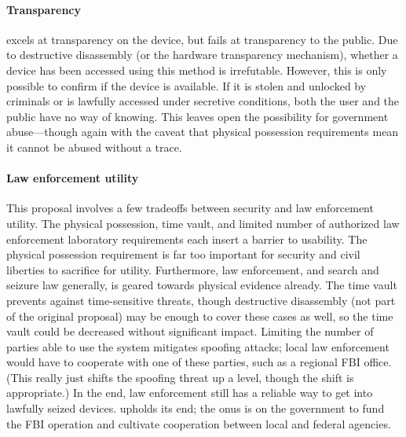 \paragraph*{Transparency} \ldawmsr excels at transparency on the device, but fails at transparency to the public. Due to
destructive disassembly (or the hardware transparency mechanism), whether a device has been accessed using this method
is irrefutable. However, this is only possible to confirm if the device is available. If it is stolen and unlocked by
criminals or is lawfully accessed under secretive conditions, both the user and the public have no way of knowing. This
leaves open the possibility for government abuse---though again with the caveat that physical possession requirements
mean it cannot be abused without a trace.

\paragraph*{Law enforcement utility} This proposal involves a few tradeoffs between security and law enforcement
utility. The physical possession, time vault, and limited number of authorized law enforcement laboratory requirements
each insert a barrier to usability. The physical possession requirement is far too important for security and civil
liberties to sacrifice for utility. Furthermore, law enforcement, and search and seizure law generally, is geared
towards physical evidence already. The time vault prevents against time-sensitive threats, though destructive
disassembly (not part of the original proposal) may be enough to cover these cases as well, so the time vault could be
decreased without significant impact. Limiting the number of parties able to use the system mitigates spoofing attacks;
local law enforcement would have to cooperate with one of these parties, such as a regional \ac{FBI} office. (This
really just shifts the spoofing threat up a level, though the shift is appropriate.) In the end, law enforcement still
has a reliable way to get into lawfully seized devices. \ldawmsr upholds its end; the onus is on the government to fund
the \ac{FBI} operation and cultivate cooperation between local and federal agencies.

